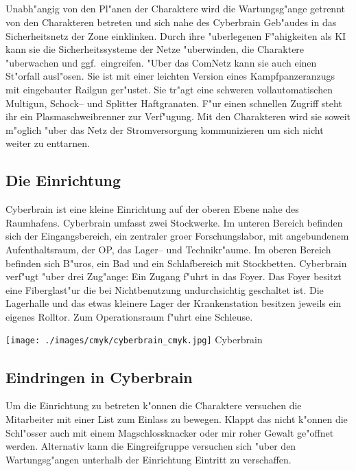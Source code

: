 \subsection{\xl} 
Unabh"angig von den Pl"anen der Charaktere wird \xl{} die Wartungsg"ange getrennt von den Charakteren betreten und sich nahe des Cyberbrain Geb"audes in das Sicherheitsnetz der Zone einklinken. Durch ihre "uberlegenen F"ahigkeiten als KI kann sie die Sicherheitssysteme der Netze "uberwinden, die Charaktere "uberwachen und ggf.~eingreifen. "Uber das ComNetz kann sie auch einen St"orfall ausl"osen. Sie ist mit einer leichten Version eines Kampfpanzeranzugs mit eingebauter Railgun ger"ustet. Sie tr"agt eine schweren vollautomatischen Multigun, Schock-- und Splitter Haftgranaten. F"ur einen schnellen Zugriff steht ihr ein Plasmaschwei\3brenner zur Verf"ugung. Mit den Charakteren wird sie soweit m"oglich "uber das Netz der Stromversorgung kommunizieren um sich nicht weiter zu enttarnen.

\subsection{Die Einrichtung} 
Cyberbrain ist eine kleine Einrichtung auf der oberen Ebene nahe des Raumhafens. Cyberbrain umfasst zwei Stockwerke. Im unteren Bereich befinden sich der Eingangsbereich, ein zentraler gro\3er Forschungslabor, mit angebundenem Aufenthaltsraum, der OP, das Lager-- und Technikr"aume. Im oberen Bereich befinden sich B"uros, ein Bad und ein Schlafbereich mit Stockbetten. Cyberbrain verf"ugt "uber drei Zug"ange: Ein Zugang f"uhrt in das Foyer. Das Foyer besitzt eine Fiberglast"ur die bei Nichtbenutzung undurchsichtig geschaltet ist. Die Lagerhalle und das etwas kleinere Lager der Krankenstation besitzen jeweils ein eigenes Rolltor. Zum Operationsraum f"uhrt eine Schleuse.

\begin{figure*}[htbp]
	\centering
    \texttt{[image: ./images/cmyk/cyberbrain\_cmyk.jpg]}
    \newline{}Cyberbrain
	\label{fig:cyberbrain}
\end{figure*}

\subsection{Eindringen in Cyberbrain} 
Um die Einrichtung zu betreten k"onnen die Charaktere versuchen die Mitarbeiter mit einer List zum Einlass zu bewegen. Klappt das nicht k"onnen die Schl"osser auch mit einem Magschlossknacker oder mir roher Gewalt ge"offnet werden. Alternativ kann die Eingreifgruppe versuchen sich "uber den Wartungsg"angen unterhalb der Einrichtung Eintritt zu verschaffen.

